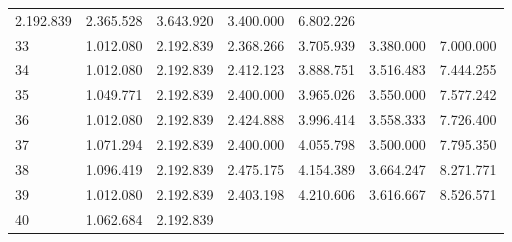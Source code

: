 \begin{tabular}{lllllll}
  \multicolumn{1}{r}{2.192.839} &
  \multicolumn{1}{r}{2.365.528} &
  \multicolumn{1}{r}{3.643.920} &
  \multicolumn{1}{r}{3.400.000} &
  \multicolumn{1}{r}{6.802.226} \\
\multicolumn{1}{l}{\hspace{1em}33} &
  \multicolumn{1}{|r}{1.012.080} &
  \multicolumn{1}{r}{2.192.839} &
  \multicolumn{1}{r}{2.368.266} &
  \multicolumn{1}{r}{3.705.939} &
  \multicolumn{1}{r}{3.380.000} &
  \multicolumn{1}{r}{7.000.000} \\
\multicolumn{1}{l}{\hspace{1em}34} &
  \multicolumn{1}{|r}{1.012.080} &
  \multicolumn{1}{r}{2.192.839} &
  \multicolumn{1}{r}{2.412.123} &
  \multicolumn{1}{r}{3.888.751} &
  \multicolumn{1}{r}{3.516.483} &
  \multicolumn{1}{r}{7.444.255} \\
\multicolumn{1}{l}{\hspace{1em}35} &
  \multicolumn{1}{|r}{1.049.771} &
  \multicolumn{1}{r}{2.192.839} &
  \multicolumn{1}{r}{2.400.000} &
  \multicolumn{1}{r}{3.965.026} &
  \multicolumn{1}{r}{3.550.000} &
  \multicolumn{1}{r}{7.577.242} \\
\multicolumn{1}{l}{\hspace{1em}36} &
  \multicolumn{1}{|r}{1.012.080} &
  \multicolumn{1}{r}{2.192.839} &
  \multicolumn{1}{r}{2.424.888} &
  \multicolumn{1}{r}{3.996.414} &
  \multicolumn{1}{r}{3.558.333} &
  \multicolumn{1}{r}{7.726.400} \\
\multicolumn{1}{l}{\hspace{1em}37} &
  \multicolumn{1}{|r}{1.071.294} &
  \multicolumn{1}{r}{2.192.839} &
  \multicolumn{1}{r}{2.400.000} &
  \multicolumn{1}{r}{4.055.798} &
  \multicolumn{1}{r}{3.500.000} &
  \multicolumn{1}{r}{7.795.350} \\
\multicolumn{1}{l}{\hspace{1em}38} &
  \multicolumn{1}{|r}{1.096.419} &
  \multicolumn{1}{r}{2.192.839} &
  \multicolumn{1}{r}{2.475.175} &
  \multicolumn{1}{r}{4.154.389} &
  \multicolumn{1}{r}{3.664.247} &
  \multicolumn{1}{r}{8.271.771} \\
\multicolumn{1}{l}{\hspace{1em}39} &
  \multicolumn{1}{|r}{1.012.080} &
  \multicolumn{1}{r}{2.192.839} &
  \multicolumn{1}{r}{2.403.198} &
  \multicolumn{1}{r}{4.210.606} &
  \multicolumn{1}{r}{3.616.667} &
  \multicolumn{1}{r}{8.526.571} \\
\multicolumn{1}{l}{\hspace{1em}40} &
  \multicolumn{1}{|r}{1.062.684} &
  \multicolumn{1}{r}{2.192.839} &

\end{tabular}
